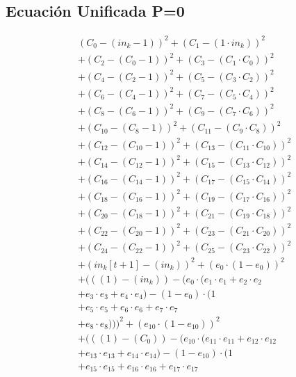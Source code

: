 \documentclass[10pt, a4paper]{article}
\begin{document}
\subsection*{Ecuación Unificada P=0}
\begin{align*}
& (C_{0} - (in_k - 1))^{2} + (C_{1} - (1  \cdot  in_k))^{2} \\
& + (C_{2} - (C_{0} - 1))^{2} + (C_{3} - (C_{1}  \cdot  C_{0}))^{2} \\
& + (C_{4} - (C_{2} - 1))^{2} + (C_{5} - (C_{3}  \cdot  C_{2}))^{2} \\
& + (C_{6} - (C_{4} - 1))^{2} + (C_{7} - (C_{5}  \cdot  C_{4}))^{2} \\
& + (C_{8} - (C_{6} - 1))^{2} + (C_{9} - (C_{7}  \cdot  C_{6}))^{2} \\
& + (C_{10} - (C_{8} - 1))^{2} + (C_{11} - (C_{9}  \cdot  C_{8}))^{2} \\
& + (C_{12} - (C_{10} - 1))^{2} + (C_{13} - (C_{11}  \cdot  C_{10}))^{2} \\
& + (C_{14} - (C_{12} - 1))^{2} + (C_{15} - (C_{13}  \cdot  C_{12}))^{2} \\
& + (C_{16} - (C_{14} - 1))^{2} + (C_{17} - (C_{15}  \cdot  C_{14}))^{2} \\
& + (C_{18} - (C_{16} - 1))^{2} + (C_{19} - (C_{17}  \cdot  C_{16}))^{2} \\
& + (C_{20} - (C_{18} - 1))^{2} + (C_{21} - (C_{19}  \cdot  C_{18}))^{2} \\
& + (C_{22} - (C_{20} - 1))^{2} + (C_{23} - (C_{21}  \cdot  C_{20}))^{2} \\
& + (C_{24} - (C_{22} - 1))^{2} + (C_{25} - (C_{23}  \cdot  C_{22}))^{2} \\
& + (in_k[t+1] - (in_k))^{2} + (e_{0} \cdot (1 - e_{0}))^{2} \\
& + (((1) - (in_k)) - (e_{0} \cdot (e_{1} \cdot e_{1} + e_{2} \cdot e_{2} \\
& + e_{3} \cdot e_{3} + e_{4} \cdot e_{4}) - (1 - e_{0}) \cdot (1 \\
& + e_{5} \cdot e_{5} + e_{6} \cdot e_{6} + e_{7} \cdot e_{7} \\
& + e_{8} \cdot e_{8})))^{2} + (e_{10} \cdot (1 - e_{10}))^{2} \\
& + (((1) - (C_{0})) - (e_{10} \cdot (e_{11} \cdot e_{11} + e_{12} \cdot e_{12} \\
& + e_{13} \cdot e_{13} + e_{14} \cdot e_{14}) - (1 - e_{10}) \cdot (1 \\
& + e_{15} \cdot e_{15} + e_{16} \cdot e_{16} + e_{17} \cdot e_{17} \\

\end{align*}
\end{document}
